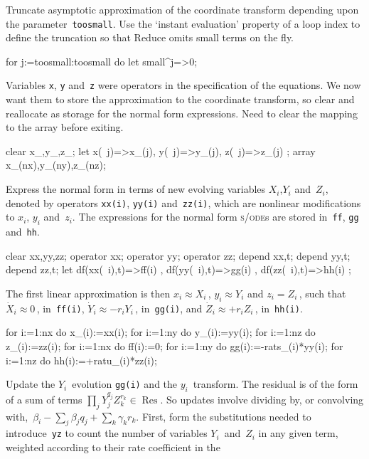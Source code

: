 \documentclass[11pt,a5paper]{article}
\newcommand{\res}{\operatorname{Res}}
\def\sde{\textsc{s/ode}}
\begin{document}
Truncate asymptotic approximation of the coordinate
transform depending upon the parameter~\verb|toosmall|. Use
the `instant evaluation' property of a loop index to define
the truncation so that Reduce omits small terms on the fly.
\begin{reduce}
for j:=toosmall:toosmall do let small^j=>0;
\end{reduce}

Variables \verb|x|, \verb|y| and~\verb|z| were operators in
the specification of the equations. We now want them to
store the approximation to the coordinate transform, so
clear and reallocate as storage for the normal form
expressions.   Need to clear the mapping to the array before
exiting.
\begin{reduce}
clear x_,y_,z_;
let { x(~j)=>x_(j), y(~j)=>y_(j), z(~j)=>z_(j) };
array x_(nx),y_(ny),z_(nz);
\end{reduce}

Express the normal form in terms of new evolving variables
$X_i$,$Y_i$ and~$Z_i$, denoted by operators \verb|xx(i)|,
\verb|yy(i)| and~\verb|zz(i)|, which are nonlinear
modifications to $x_i$, $y_i$ and~$z_i$. The expressions for
the normal form \sde{}s are stored in~\verb|ff|, \verb|gg|
and~\verb|hh|.
\begin{reduce}
clear xx,yy,zz;
operator xx; operator yy; operator zz;
depend xx,t; depend yy,t; depend zz,t;
let { df(xx(~i),t)=>ff(i) 
    , df(yy(~i),t)=>gg(i) 
    , df(zz(~i),t)=>hh(i) };
\end{reduce}

The first linear approximation is then $x_i\approx X_i$\,,
$y_i\approx Y_i$ and $z_i=Z_i$\,, such that $\dot X_i\approx
0$\,, in~\verb|ff(i)|, $\dot Y_i\approx -r_iY_i$\,,
in~\verb|gg(i)|, and  $\dot Z_i\approx +r_iZ_i$\,,
in~\verb|hh(i)|.
\begin{reduce}
for i:=1:nx do x_(i):=xx(i);
for i:=1:ny do y_(i):=yy(i);
for i:=1:nz do z_(i):=zz(i);
for i:=1:nx do ff(i):=0;
for i:=1:ny do gg(i):=-rats_(i)*yy(i);
for i:=1:nz do hh(i):=+ratu_(i)*zz(i);
\end{reduce}

Update the $Y_i$~evolution \verb|gg(i)| and the
$y_i$~transform. The residual is of the form of a sum of
terms $\prod_{j}Y_j^{q_j}Z_k^{r_k} \in\res$. So updates
involve dividing by, or convolving
with,~$\beta_i-\sum_j\beta_jq_j+\sum_k\gamma_kr_k$. First,
form the substitutions needed to introduce~\verb|yz| to
count the number of variables $Y_i$~and~$Z_i$ in any given
term, weighted according to their rate coefficient in the
\end{document}
